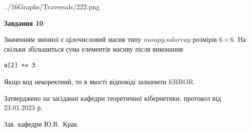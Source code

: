 \documentclass[12pt, ukrainian]{article}
\begin{document}
{\begin {large}
\begin{center}
	{../16Graphs/Traversals/222.png}
\end{center}\par
\newpage

{\begin {center}\textbf{Завдання 10}\end {center}}\par
Значенням змінної  є цілочисловий масив типу $numpy.ndarray$ розмірів $6{\times}6$. На скільки збільшиться сума елементів масиву  після виконання
\begin{verbatim}
a[2] += 3
\end{verbatim}


Якщо код некоректний, то в якості відповіді зазначити ERROR.\par
\newpage


\end {large}
}
{\smallskip \begin {small} Затверджено на засіданні кафедри теоретичної кібернетики, протокол  від   23.01.2023 р.\par\smallskip\smallskip
{\parbox {6.5 cm}{Зав. кафедри \dotfill Ю.В.~Крак}} \end{small}}
\end{document}
